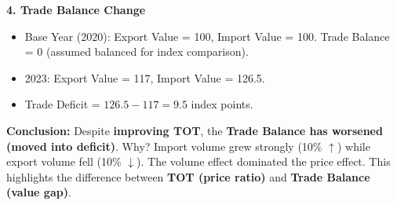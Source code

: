 \documentclass[11pt]{article}
\begin{document}
\begin{exoresolu}
\textbf{4. Trade Balance Change}
\begin{itemize}
    \item Base Year (2020): Export Value = 100, Import Value = 100. Trade Balance = 0 (assumed balanced for index comparison).
    \item 2023: Export Value = 117, Import Value = 126.5.
    \item Trade Deficit = $126.5 - 117 = 9.5$ index points.
\end{itemize}
\textbf{Conclusion:} Despite \textbf{improving TOT}, the \textbf{Trade Balance has worsened (moved into deficit)}. Why? Import volume grew strongly (10\% $\uparrow$) while export volume fell (10\% $\downarrow$). The volume effect dominated the price effect. This highlights the difference between \textbf{TOT (price ratio)} and \textbf{Trade Balance (value gap)}.


\end{exoresolu}
\end{document}
